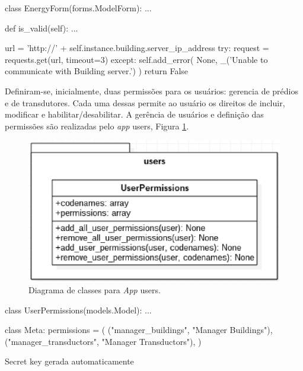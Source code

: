 \begin{python}[caption={Corpo do método is\_valid, classe EnergyForm.}, captionpos=b]
class EnergyForm(forms.ModelForm):
    ...

    def is_valid(self):
        ...

        url = 'http://' + self.instance.building.server_ip_address
        try:
            request = requests.get(url, timeout=3)
        except:
            self.add_error(
                None,
                _('Unable to communicate with Building server.')
            )
            return False
\end{python}

Definiram-se, inicialmente, duas permissões para os usuários: gerencia de prédios e de transdutores. Cada uma dessas permite ao usuário os direitos de incluir, modificar e habilitar/desabilitar. A gerência de usuários e definição das permissões são realizadas pelo \textit{app} users, Figura \ref{app_users}.

\begin{figure}[!h]
    \centering
    \includegraphics[keepaspectratio=true,scale=0.8]{figuras/app_users.eps}
    \caption{Diagrama de classes para \textit{App} users.}
    \label{app_users}
\end{figure}

\begin{python}[caption={Permissões presentes na classe UserPermissions.}, captionpos=b]
class UserPermissions(models.Model):
    ...

    class Meta:
        permissions = (
            ("manager_buildings", "Manager Buildings"),
            ("manager_transductors", "Manager Transductors"),
        )
\end{python}

Secret key gerada automaticamente

